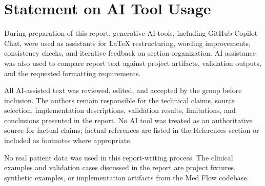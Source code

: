 \section{Statement on AI Tool Usage}
\label{sec:ai-tool-usage}

During preparation of this report, generative AI tools, including GitHub Copilot Chat, were used as assistants for LaTeX restructuring, wording improvements, consistency checks, and iterative feedback on section organization. AI assistance was also used to compare report text against project artifacts, validation outputs, and the requested formatting requirements.

All AI-assisted text was reviewed, edited, and accepted by the group before inclusion. The authors remain responsible for the technical claims, source selection, implementation descriptions, validation results, limitations, and conclusions presented in the report. No AI tool was treated as an authoritative source for factual claims; factual references are listed in the References section or included as footnotes where appropriate.

No real patient data was used in this report-writing process. The clinical examples and validation cases discussed in the report are project fixtures, synthetic examples, or implementation artifacts from the Med Flow codebase.
